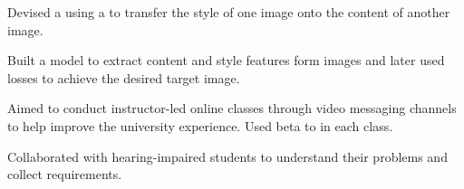\documentclass[]{rinkal_resume}
\begin{document}
 
\vspace{2pt}
\begin{tightemize}
\item Devised a  using a  to transfer the style of one image onto the content of another image.
\item Built a model to extract content and style features form images and later used losses to achieve the desired target image.
\end{tightemize}
\sectionsep

 
\vspace{2pt}
\begin{tightemize}
\item Aimed to conduct instructor-led online classes  through video messaging channels to help improve the university experience. Used beta to  in each class.
\item Collaborated with hearing-impaired students to understand their problems and collect requirements.
\end{tightemize}
\end{document}

